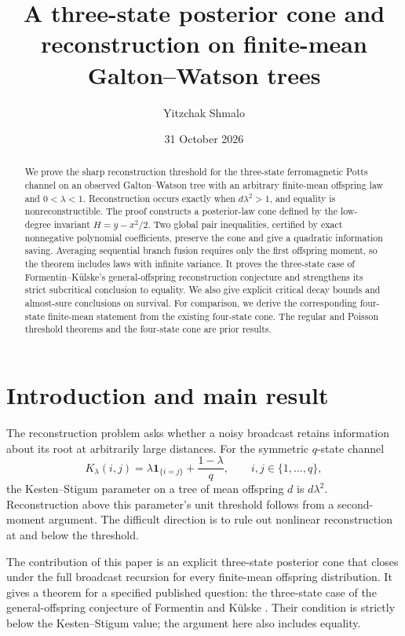 \documentclass[11pt,reqno]{amsart}
\title[A three-state posterior cone]{A three-state posterior cone and reconstruction on finite-mean Galton--Watson trees}
\author{Yitzchak Shmalo}
\date{31 October 2026}
\theoremstyle{definition}
\theoremstyle{remark}
\newcommand{\ind}{\mathbf 1}
\begin{document}
\begin{abstract}
We prove the sharp reconstruction threshold for the three-state ferromagnetic Potts channel on an observed Galton--Watson tree with an arbitrary finite-mean offspring law and $0<\lambda<1$. Reconstruction occurs exactly when $d\lambda^2>1$, and equality is nonreconstructible. The proof constructs a posterior-law cone defined by the low-degree invariant $H=y-x^2/2$. Two global pair inequalities, certified by exact nonnegative polynomial coefficients, preserve the cone and give a quadratic information saving. Averaging sequential branch fusion requires only the first offspring moment, so the theorem includes laws with infinite variance. It proves the three-state case of Formentin--K\"ulske's general-offspring reconstruction conjecture and strengthens its strict subcritical conclusion to equality. We also give explicit critical decay bounds and almost-sure conclusions on survival. For comparison, we derive the corresponding four-state finite-mean statement from the existing four-state cone. The regular and Poisson threshold theorems and the four-state cone are prior results.
\end{abstract}
\maketitle

\section{Introduction and main result}

The reconstruction problem asks whether a noisy broadcast retains information about its root at arbitrarily large distances. For the symmetric $q$-state channel
\begin{equation}\label{eq:channel}
 K_\lambda(i,j)=\lambda\ind_{\{i=j\}}+\frac{1-\lambda}{q},
 \qquad i,j\in\{1,\ldots,q\},
\end{equation}
the Kesten--Stigum parameter on a tree of mean offspring $d$ is $d\lambda^2$. Reconstruction above this parameter's unit threshold follows from a second-moment argument. The difficult direction is to rule out nonlinear reconstruction at and below the threshold.

The contribution of this paper is an explicit three-state posterior cone that closes under the full broadcast recursion for every finite-mean offspring distribution. It gives a theorem for a specified published question: the three-state case of the general-offspring conjecture of Formentin and K\"ulske \cite[Conjecture 2.13, equation (45)]{FK2009}. Their condition is strictly below the Kesten--Stigum value; the argument here also includes equality.
\end{document}
